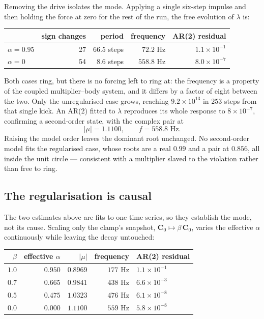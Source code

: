 \documentclass[11pt,a4paper]{article}
\begin{document}
Removing the drive isolates the mode. Applying a single six-step impulse and then holding the
force at zero for the rest of the run, the free evolution of $\lambda$ is:

\begin{center}\small
\begin{tabular}{@{}lrrrr@{}}
\toprule
 & sign changes & period & frequency & AR(2) residual \\
\midrule
$\alpha = 0.95$ & 27 & $66.5$ steps & $72.2$ Hz & $1.1\times10^{-1}$ \\
$\alpha = 0$    & 54 & $8.6$ steps  & $558.8$ Hz & $8.0\times10^{-7}$ \\
\bottomrule
\end{tabular}
\end{center}

Both cases ring, but there is no forcing left to ring at: the frequency is a property of the
coupled multiplier--body system, and it differs by a factor of eight between the two. Only the
unregularised case grows, reaching $9.2\times10^{13}$ in $253$ steps from that single kick. An
AR(2) fitted to $\lambda$ reproduces its whole response to $8\times10^{-7}$, confirming a
second-order state, with the complex pair at
\begin{equation}
  \lvert\mu\rvert = 1.1100 , \qquad f = 558.8\text{ Hz} .
\end{equation}
Raising the model order leaves the dominant root unchanged. No second-order model fits the
regularised case, whose roots are a real $0.99$ and a pair at $0.856$, all inside the unit
circle --- consistent with a multiplier slaved to the violation rather than free to ring.

\subsection{The regularisation is causal}

The two estimates above are fits to one time series, so they establish the mode, not its cause.
Scaling only the clamp's snapshot, $\mathbf{C}_0 \mapsto \beta\,\mathbf{C}_0$, varies the
effective $\alpha$ continuously while leaving the decay untouched:

\begin{center}\small
\begin{tabular}{@{}rrrrl@{}}
\toprule
$\beta$ & effective $\alpha$ & $\lvert\mu\rvert$ & frequency & AR(2) residual \\
\midrule
$1.0$ & $0.950$ & $0.8969$ & $177$ Hz & $1.1\times10^{-1}$ \\
$0.7$ & $0.665$ & $0.9841$ & $438$ Hz & $6.6\times10^{-3}$ \\
$0.5$ & $0.475$ & $1.0323$ & $476$ Hz & $6.1\times10^{-8}$ \\
$0.0$ & $0.000$ & $1.1100$ & $559$ Hz & $5.8\times10^{-8}$ \\
\bottomrule
\end{tabular}
\end{center}
\end{document}
